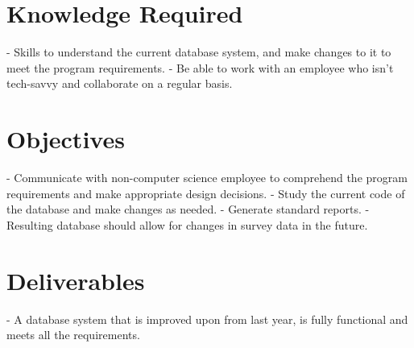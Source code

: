 \documentclass[onecolumn, draftclsnofoot,10pt, compsoc]{IEEEtran}
\begin{document}
\section{Knowledge Required}
- Skills to understand the current database system, and make changes to it to meet the program requirements.\newline
- Be able to work with an employee who isn't tech-savvy and collaborate on a regular basis.
\section{Objectives}
- Communicate with non-computer science employee to comprehend the program requirements and make appropriate design decisions. \newline
- Study the current code of the database and make changes as needed.
- Generate standard reports.
- Resulting database should allow for changes in survey data in the future.
\section{Deliverables}
- A database system that is improved upon from last year, is fully functional and meets all the requirements.
\end{document}
